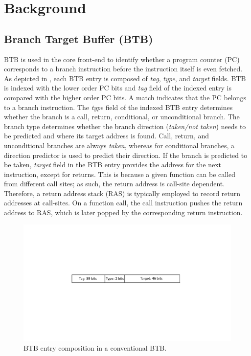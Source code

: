 \section{Background}
\label{cal:sec:background}

\subsection{Branch Target Buffer (BTB)}
BTB is used in the core front-end to identify whether a program counter (PC) corresponds to a branch instruction before the instruction itself is even fetched. As depicted in , each BTB entry is composed of \textit{tag}, \textit{type}, and \textit{target} fields. BTB is indexed with the lower order PC bits and \textit{tag} field of the indexed entry is compared with the higher order PC bits. A match indicates that the PC belongs to a branch instruction. The \textit{type} field of the indexed BTB entry determines whether the branch is a call, return, conditional, or unconditional branch. The branch type determines whether the branch direction (\textit{taken/not taken}) needs to be predicted and where its target address is found. Call, return, and unconditional branches are always \textit{taken}, whereas for conditional branches, a direction predictor is used to predict their direction. If the branch is predicted to be taken, \textit{target} field in the BTB entry provides the address for the next instruction, except for returns. This is because a given function can be called from different call sites; as such, the return address is call-site dependent. Therefore, a return address stack (RAS) is typically employed to record return addresses at call-sites. On a function call, the call instruction pushes the return address to RAS, which is later popped by the corresponding return instruction.

\begin{figure}
\centering
\includegraphics[width=0.8\columnwidth, trim=220 260 230 230, clip]{figures/baselineBTB1.pdf}
\caption {BTB entry composition in a conventional BTB. }
\label{cal:fig:conv-btb}
\end{figure}

